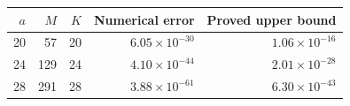 \begin{tabular}{rrrrr}
\toprule
$a$ & $M$ & $K$ & Numerical error & Proved upper bound \\
\midrule
20 & 57 & 20 & $6.05\times10^{-30}$ & $1.06\times10^{-16}$ \\
24 & 129 & 24 & $4.10\times10^{-44}$ & $2.01\times10^{-28}$ \\
28 & 291 & 28 & $3.88\times10^{-61}$ & $6.30\times10^{-43}$ \\
\bottomrule
\end{tabular}
